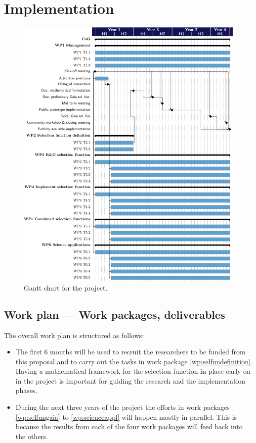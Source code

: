 \chapter{Implementation}
\label{cha:implementation}

\begin{figure}[t]
    \centering
    \includegraphics{img/cog-gantt.pdf}
    \caption{Gantt chart for the {\acro} project.}
    \label{fig:gantt}
\end{figure}

\section{Work plan --- Work packages, deliverables}
\label{sec:work-plan}

The overall work plan is structured as follows:
\begin{itemize}
    \item The first 6 months will be used to recruit the researchers to be funded from this proposal and to carry out the tasks in work package \ref{wp:selfundefinition}. Having a mathematical framework for the selection function in place early on in the project is important for guiding the research and the implementation phases.
    \item During the next three years of the project the efforts in work packages \ref{wp:selfungaia} to \ref{wp:scienceappl} will happen mostly in parallel. This is because the results from each of the four work packages will feed back into the others. 
 \end{itemize}

